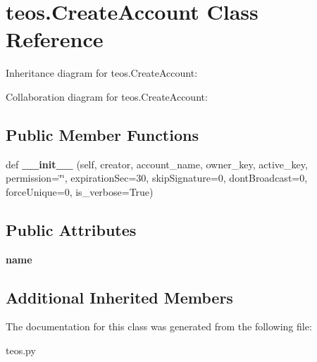 \hypertarget{classteos_1_1CreateAccount}{}\section{teos.\+Create\+Account Class Reference}
\label{classteos_1_1CreateAccount}


Inheritance diagram for teos.\+Create\+Account\+:


Collaboration diagram for teos.\+Create\+Account\+:
\subsection*{Public Member Functions}
\begin{DoxyCompactItemize}
\item 
\mbox{\label{classteos_1_1CreateAccount_aa0601794ebde984dc9c6801f2e119e47}} 
def {\bfseries \+\_\+\+\_\+init\+\_\+\+\_\+} (self, creator, account\+\_\+name, owner\+\_\+key, active\+\_\+key, permission=\char`\"{}\char`\"{}, expiration\+Sec=30, skip\+Signature=0, dont\+Broadcast=0, force\+Unique=0, is\+\_\+verbose=True)
\end{DoxyCompactItemize}
\subsection*{Public Attributes}
\begin{DoxyCompactItemize}
\item 
\mbox{\label{classteos_1_1CreateAccount_a6da3604bb38dbf4a4d19553b99d059d6}} 
{\bfseries name}
\end{DoxyCompactItemize}
\subsection*{Additional Inherited Members}


The documentation for this class was generated from the following file\+:\begin{DoxyCompactItemize}
\item 
teos.\+py\end{DoxyCompactItemize}
